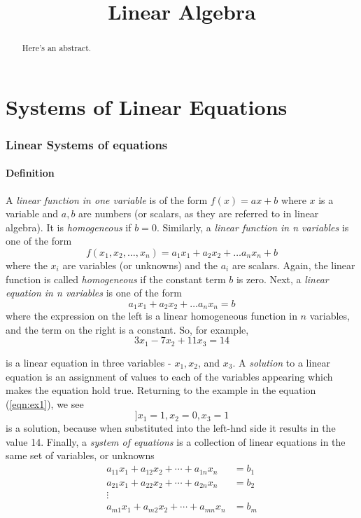 \documentclass[handout]{ximera}
\title{Linear Algebra}
\numberwithin{equation}{section}
\begin{document}
\begin{abstract}
Here's an abstract.
\end{abstract}
\maketitle

\part{Systems of Linear Equations}

\section{Linear Systems of equations} 


\subsection{Definition} A {\it linear function in one variable} is of the form $f(x) = ax+b$ where $x$ is a variable and $a,b$ are numbers (or scalars, as they are referred to in linear algebra). It is {\it homogeneous} if $b=0$. Similarly, a {\it linear function in n variables} is one of the form
\[
f(x_1,x_2,\dots,x_n) = a_1x_1 + a_2x_2 + \dots a_nx_n + b
\]
where the $x_i$ are variables (or unknowns) and the $a_i$ are scalars. Again, the linear function is called {\it homogeneous} if the constant term $b$ is zero. Next, a {\it linear equation in n variables} is one of the form
\[
a_1x_1 + a_2x_2 + \dots a_nx_n =  b
\]
where the expression on the left is a linear homogeneous function in $n$ variables, and the term on the right is a constant. So, for example, 
\begin{equation}\label{eqn:ex1}
3x_1 - 7x_2 + 11x_3 = 14
\end{equation}

is a linear equation in three variables - $x_1, x_2$, and $x_3$. A {\it solution} to a linear equation is an assignment of values to each of the variables appearing which makes the equation hold true. Returning to the example in the equation (\ref{eqn:ex1}), we see
\[]
x_1 = 1, x_2 = 0, x_3 = 1
\]
is a solution, because when substituted into the left-hnd side it results in the value 14. Finally, a {\it system of equations} is a collection of linear equations in the same set of variables, or unknowns
\begin{align*}
a_{11}x_1 + a_{12}x_2  + {}\cdots{}  + a_{1n}x_n &=  b_1 \\
a_{21}x_1 +  a_{22}x_2 +   {}\cdots{}  + a_{2n}x_n &= b_2 \\
\vdots \\
a_{m1}x_1 + a_{m2}x_2  + {}\cdots{} + a_{mn}x_n &=  b_m 
\end{align*}
\end{document}

